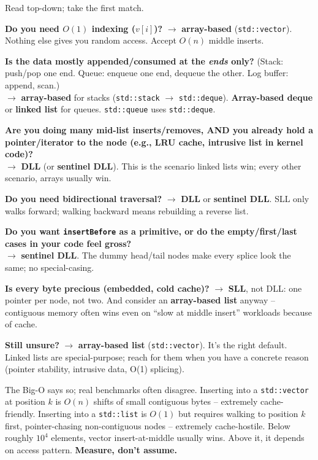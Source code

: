 \documentclass[11pt]{article}
\begin{document}
\begin{ideabox}
Read top-down; take the first match.

\medskip
\textbf{Do you need $O(1)$ indexing ($v[i]$)?}
$\to$ \textbf{array-based} (\texttt{std::vector}). Nothing else gives you
random access. Accept $O(n)$ middle inserts.

\medskip
\textbf{Is the data mostly appended/consumed at the \emph{ends} only?}
(Stack: push/pop one end. Queue: enqueue one end, dequeue the other.
Log buffer: append, scan.)\\
$\to$ \textbf{array-based} for stacks (\texttt{std::stack} $\to$
\texttt{std::deque}). \textbf{Array-based deque} or \textbf{linked list}
for queues. \texttt{std::queue} uses \texttt{std::deque}.

\medskip
\textbf{Are you doing many mid-list inserts/removes, AND you already hold
a pointer/iterator to the node (e.g., LRU cache, intrusive list in
kernel code)?}\\
$\to$ \textbf{DLL} (or \textbf{sentinel DLL}). This is the scenario linked
lists win; every other scenario, arrays usually win.

\medskip
\textbf{Do you need bidirectional traversal?}
$\to$ \textbf{DLL} or \textbf{sentinel DLL}. SLL only walks forward;
walking backward means rebuilding a reverse list.

\medskip
\textbf{Do you want \texttt{insertBefore} as a primitive, or do the
empty/first/last cases in your code feel gross?}\\
$\to$ \textbf{sentinel DLL}. The dummy head/tail nodes make every splice
look the same; no special-casing.

\medskip
\textbf{Is every byte precious (embedded, cold cache)?}
$\to$ \textbf{SLL}, not DLL: one pointer per node, not two. And consider
an \textbf{array-based list} anyway -- contiguous memory often wins even
on ``slow at middle insert'' workloads because of cache.

\medskip
\textbf{Still unsure?}
$\to$ \textbf{array-based list} (\texttt{std::vector}). It's the right
default. Linked lists are special-purpose; reach for them when you have
a concrete reason (pointer stability, intrusive data, O(1) splicing).
\end{ideabox}

\begin{warnbox}
The Big-O says so; real benchmarks often disagree. Inserting into a
\texttt{std::vector} at position $k$ is $O(n)$ shifts of small contiguous
bytes -- extremely cache-friendly. Inserting into a \texttt{std::list} is
$O(1)$ but requires walking to position $k$ first, pointer-chasing
non-contiguous nodes -- extremely cache-hostile. Below roughly $10^4$
elements, vector insert-at-middle usually wins. Above it, it depends on
access pattern. \textbf{Measure, don't assume.}
\end{warnbox}
\end{document}
